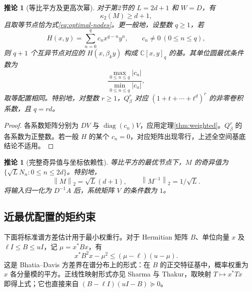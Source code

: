 \documentclass[UTF8,a4paper,zihao=-4,fontset=windows]{ctexart}
\theoremstyle{chinese}
\newtheorem{corollary}[theorem]{推论}
\numberwithin{equation}{section}
\newcommand{\C}{\mathbb C}
\newcommand{\diag}{\operatorname{diag}}
\newcommand{\norm}[1]{\left\lVert#1\right\rVert_2}
\newcommand{\cond}{\kappa_2}
\begin{document}
\begin{corollary}[等比平方及更高次幂]\label{thm:optimal}
对于第2节的 $L=2d+1$ 和 $W=D$，有
\begin{equation}\label{eq:opt}
\cond(M)\ge d+1,
\end{equation}
且取等节点恰为式\eqref{eq:optimal-nodes}。更一般地，设整数 $q\ge1$，若
\[
H(x,y)=\sum_{n=0}^{q}c_nx^{q-n}y^n,\qquad c_n\ne0\ (0\le n\le q),
\]
则 $q+1$ 个互异节点对应的 $H(x,\beta_k y)$ 构成 $\C[x,y]_q$ 的基。其单位圆最优条件数为
\[
\frac{\max_{0\le n\le q}|c_n|}{\min_{0\le n\le q}|c_n|},
\]
取等配置相同。特别地，对整数 $r\ge1$，$Q_\beta^r$ 对应 $(1+t+\cdots+t^d)^r$ 的非零卷积系数，且 $q=rd$。
\end{corollary}
\begin{proof}
各系数矩阵分别为 $DV$ 与 $\diag(c_n)V$，应用定理\ref{thm:weighted}。$Q_\beta^r$ 的各系数为正整数。若一般 $H$ 的某个 $c_n=0$，对应矩阵出现零行，上述全空间基底结论不适用。
\end{proof}

\begin{corollary}[完整奇异值与坐标依赖性]\label{cor:singular}
等比平方的最优节点下，$M$ 的奇异值为 $\{\sqrt L N_n:0\le n\le2d\}$。特别地，
\[
\norm M=\sqrt L(d+1),\qquad \norm{M^{-1}}=1/\sqrt L.
\]
将输入归一化为 $D^{-1}A$ 后，系统矩阵 $V$ 的条件数为 $1$。
\end{corollary}

\subsection{近最优配置的矩约束}
下面将标准谱方差估计用于最小权重行。对于 Hermitian 矩阵 $B$、单位向量 $x$ 及 $\ell I\le B\le uI$，记 $\mu=x^*Bx$，有
\begin{equation}\label{eq:spectral-variance}
x^*B^2x-\mu^2\le(\mu-\ell)(u-\mu).
\end{equation}
这是 Bhatia--Davis 方差界\cite{bhatia}在谱分布上的形式：在 $B$ 的正交特征基中，概率权重为 $x$ 各分量模的平方。正线性映射形式亦见 Sharma 与 Thakur\cite[式(1.2)]{sharma}，取映射 $T\mapsto x^*Tx$ 即得上式；它也直接来自 $(B-\ell I)(uI-B)\succeq0$。
\end{document}
